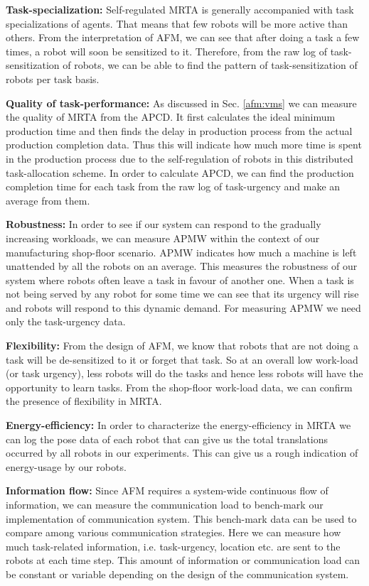 \documentclass[smallcondensed]{svjour3}
\begin{document}
\textbf{Task-specialization:} Self-regulated MRTA is generally accompanied with task specializations of agents. That means that few robots will be more active than others. From the interpretation of AFM, we can see that after doing a task a few times, a robot will soon be sensitized to it. Therefore, from the raw log of task-sensitization of robots, we can be able to find the pattern of task-sensitization of robots per task basis.

\textbf{Quality of task-performance:} As discussed in Sec. \ref{afm:vms} we can measure the quality of MRTA from the APCD. It first calculates the ideal minimum production time and then finds the delay in production process from the actual production completion data. Thus this will indicate how much more time is  spent in the production process due to the self-regulation of robots in this distributed task-allocation scheme.  In order to calculate APCD, we can find the production completion time for each task from the raw log of task-urgency and make an average from them.

\textbf{Robustness:} In order to see if our system can respond to the gradually increasing workloads,  we can measure APMW within the context of our manufacturing shop-floor scenario. APMW indicates how much a machine is left unattended by all the robots on an average. This measures the robustness of our system where robots often leave a task in favour of another one. When a task is not being served by any robot for some time we can see that its urgency will rise and robots will respond to this dynamic demand. For measuring APMW we need only the task-urgency data.

\textbf{Flexibility:} From the design of AFM, we know that robots that are not doing a task will be de-sensitized to it or forget that task. So at an overall low work-load (or task urgency), less robots will do the tasks and hence less robots will have the opportunity to learn tasks. From the shop-floor work-load data, we can confirm the presence of flexibility in MRTA.

\textbf{Energy-efficiency:} In order to characterize the energy-efficiency in MRTA we can log the pose data of each robot that can give us the total translations occurred by all robots in our experiments. This can give us a rough indication of energy-usage by our robots. 

\textbf{Information flow:} Since AFM requires a system-wide continuous flow of information, we can measure the communication load to bench-mark our implementation of communication system. This bench-mark data can be used to compare among various communication strategies. Here we can measure  how much task-related information, i.e. task-urgency, location etc. are sent to the robots at each time step. This  amount of information or communication load can be constant or variable depending on the design of the communication system.
\end{document}
